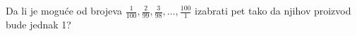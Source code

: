 \problem{}
Da li je moguće od brojeva
$\frac{1}{100}, \frac{2}{99}, \frac{3}{98}, \ldots, \frac{100}{1}$
izabrati pet tako da njihov proizvod bude jednak 1?
\solution
\endproblem
